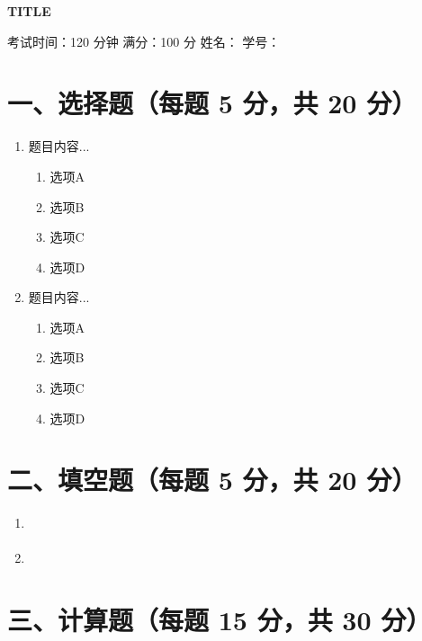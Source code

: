 \documentclass[12pt,a4paper]{article}
\begin{document}
\begin{center}
\Large\textbf{{{TITLE}}}

\vspace{0.5cm}
\normalsize
考试时间：120 分钟 \quad 满分：100 分 \quad 姓名：\underline{\hspace{3cm}} \quad 学号：\underline{\hspace{3cm}}
\end{center}

\vspace{0.5cm}

\section*{一、选择题（每题 5 分，共 20 分）}

\begin{enumerate}
  \item 题目内容...
  \begin{enumerate}[label=\Alph*.]
    \item 选项A
    \item 选项B
    \item 选项C
    \item 选项D
  \end{enumerate}

  \item 题目内容...
  \begin{enumerate}[label=\Alph*.]
    \item 选项A
    \item 选项B
    \item 选项C
    \item 选项D
  \end{enumerate}
\end{enumerate}

\section*{二、填空题（每题 5 分，共 20 分）}

\begin{enumerate}
  \item \underline{\hspace{6cm}}
  \item \underline{\hspace{6cm}}
\end{enumerate}

\section*{三、计算题（每题 15 分，共 30 分）}
\end{document}
